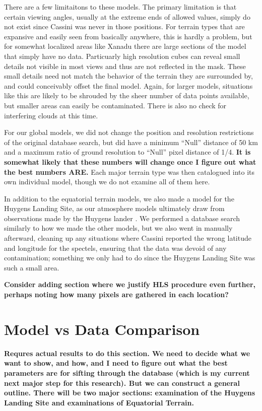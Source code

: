 \documentclass[twocolumn,linenumbers]{aastex631}
\begin{document}
There are a few limitaitons to these models. The primary limitation is that certain viewing angles, usually at the extreme ends of allowed values, simply do not exist since Cassini was never in those positions. For terrain types that are expansive and easily seen from basically anywhere, this is hardly a problem, but for somewhat localized areas like Xanadu there are large sections of the model that simply have no data. Particuarly high resolution cubes can reveal small details not visible in most views and thus are not reflected in the mask. These small details need not match the behavior of the terrain they are surrounded by, and could conceivably offset the final model. Again, for larger models, situations like this are likely to be shrouded by the sheer number of data points available, but smaller areas can easily be contaminated. There is also no check for interfering clouds at this time. 

For our global models, we did not change the position and resolution restrictions of the original database search, but did have a minimum ``Null'' distance of 50 km and a maximum ratio of ground resolution to ``Null'' pixel distance of 1/4. \textbf{\color{red}It is somewhat likely that these numbers will change once I figure out what the best numbers ARE.\color{black}}  Each major terrain type was then catalogued into its own individual model, though we do not examine all of them here. 

In addition to the equatorial terrain models, we also made a model for the Huygens Landing Site, as our atmosphere models ultimately draw from observations made by the Huygens lander \citep{Tomasko2008}. We performed a database search similarly to how we made the other models, but we also went in manually afterward, cleaning up any situations where Cassini reported the wrong latitude and longitude for the spectels, ensuring that the data was devoid of any contamination; something we only had to do since the Huygens Landing Site was such a small area. 

\textbf{\color{red}Consider adding section where we justify HLS procedure even further, perhaps noting how many pixels are gathered in each location?\color{black}} 

\section{Model vs Data Comparison} \label{sec:compare}

\textbf{\color{blue}Requres actual results to do this section. We need to decide what we want to show, and how, and I need to figure out what the best parameters are for sifting through the database (which is my current next major step for this research). But we can construct a general outline. There will be two major sections: examination of the Huygens Landing Site and examinations of Equatorial Terrain. \color{black}}
\end{document}

